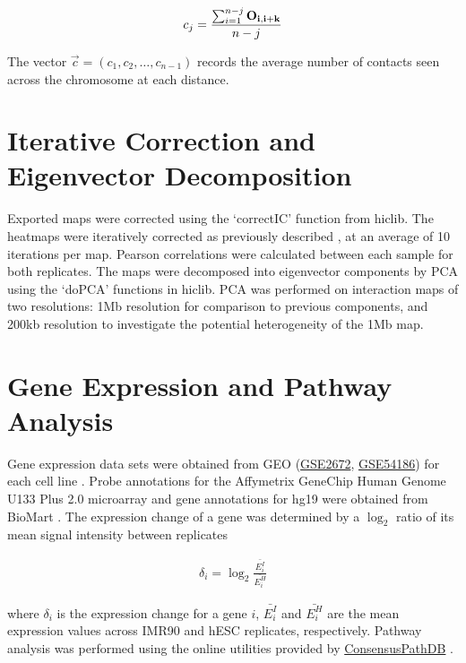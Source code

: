 \begin{align}
  c_j = \frac{\sum_{i=1}^{n - j} \mathbf{O_{i, i+k}}}{n - j} \label{eq:probeScale}
\end{align}

The vector $\vec{c} = \left(c_1, c_2, \hdots, c_{n-1}\right)$ records the average number of contacts seen across the chromosome
at each distance.

\section*{Iterative Correction and Eigenvector Decomposition}

Exported maps were corrected using the `correctIC' function from hiclib.  The heatmaps were iteratively corrected as previously
described \citep{imakaev2012}, at an average of 10 iterations per map.  Pearson correlations were calculated between each sample
for both replicates.  The maps were decomposed into eigenvector components by \gls{PCA} using the `doPCA' functions in hiclib.
\gls{PCA} was performed on interaction maps of two resolutions: 1Mb resolution for comparison to previous components, and 200kb
resolution to investigate the potential heterogeneity of the 1Mb map.

\section*{Gene Expression and Pathway Analysis}

Gene expression data sets were obtained from \gls{GEO} (\href{http://www.ncbi.nlm.nih.gov/geo/query/acc.cgi?acc=GSE2672}{GSE2672},
\href{http://www.ncbi.nlm.nih.gov/geo/query/acc.cgi?acc=GSE54186}{GSE54186}) for each cell line \citep{kim2005} \citep{kim2014}.  Probe
annotations for the Affymetrix GeneChip Human Genome U133 Plus 2.0 microarray and gene annotations for hg19 were obtained from
BioMart \citep{kasprzyk2011}.  The expression change of a gene was determined by a $\log_2$ ratio of its mean signal intensity between
replicates

\begin{align}
  \delta_i = \log_2{\frac{\bar{E_i^I}}{\bar{E_i^H}}}
\end{align}

where $\delta_i$ is the expression change for a gene $i$, $\bar{E_i^I}$ and $\bar{E_i^H}$ are the mean expression values across
IMR90 and hESC replicates, respectively.  Pathway analysis was performed using the online utilities provided by
\href{http://consensuspathdb.org/}{ConsensusPathDB} \citep{kamburov2012}.

